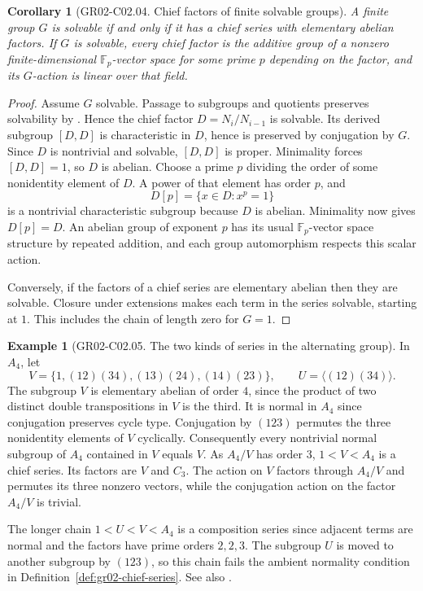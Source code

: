 \documentclass[11pt,oneside,openany]{book}
\newtheorem{corollary}[theorem]{Corollary}
\theoremstyle{definition}
\newtheorem{example}[theorem]{Example}
\theoremstyle{remark}
\begin{document}
\begin{corollary}[GR02-C02.04. Chief factors of finite solvable groups]
\label{cor:gr02-chief-solvable}
A finite group \(G\) is solvable if and only if it has a chief
series with elementary abelian factors. If \(G\) is solvable, every
chief factor is the additive group of a nonzero finite-dimensional
\(\mathbb F_p\)-vector space for some prime \(p\) depending on the
factor, and its \(G\)-action is linear over that field.
\end{corollary}
\begin{proof}
Assume \(G\) solvable. Passage to subgroups and quotients preserves
solvability by \cite[entry K07.15.solvable\_closure]{d07}. Hence the
chief factor \(D=N_i/N_{i-1}\) is solvable. Its derived subgroup
\([D,D]\) is characteristic in \(D\), hence is preserved by
conjugation by \(G\). Since \(D\) is nontrivial and solvable,
\([D,D]\) is proper. Minimality forces \([D,D]=1\), so \(D\) is
abelian. Choose a prime \(p\) dividing the order of some nonidentity
element of \(D\). A power of that element has order \(p\), and
\[
  D[p]=\{x\in D : x^p=1\}
\]
is a nontrivial characteristic subgroup because \(D\) is abelian.
Minimality now gives \(D[p]=D\). An abelian group of exponent \(p\)
has its usual \(\mathbb F_p\)-vector space structure by repeated
addition, and each group automorphism respects this scalar action.

Conversely, if the factors of a chief series are elementary
abelian then they are solvable. Closure under extensions makes
each term in the series solvable, starting at \(1\). This includes
the chain of length zero for \(G=1\).
\end{proof}

\begin{example}[GR02-C02.05. The two kinds of series in the alternating group]
\label{ex:gr02-chief-a4}
In \(A_4\), let
\[
  V=\{1,(12)(34),(13)(24),(14)(23)\},\qquad
  U=\langle(12)(34)\rangle .
\]
The subgroup \(V\) is elementary abelian of order \(4\), since the
product of two distinct double transpositions in \(V\) is the
third. It is normal in \(A_4\) since conjugation preserves cycle
type. Conjugation by \((123)\) permutes the three nonidentity
elements of \(V\) cyclically. Consequently every nontrivial
normal subgroup of \(A_4\) contained in \(V\) equals \(V\).
As \(A_4/V\) has order \(3\), \(1<V<A_4\) is a chief series.
Its factors are \(V\) and \(C_3\). The action on \(V\) factors
through \(A_4/V\) and permutes its three nonzero vectors, while
the conjugation action on the factor \(A_4/V\) is trivial.

The longer chain \(1<U<V<A_4\) is a composition series since
adjacent terms are normal and the factors have prime orders
\(2,2,3\). The subgroup \(U\) is moved to another subgroup by
\((123)\), so this chain fails the ambient normality condition
in Definition~\ref{def:gr02-chief-series}. See also
\cite[Examples~5.2 and 5.7]{chief-source}.
\end{example}
\end{document}
